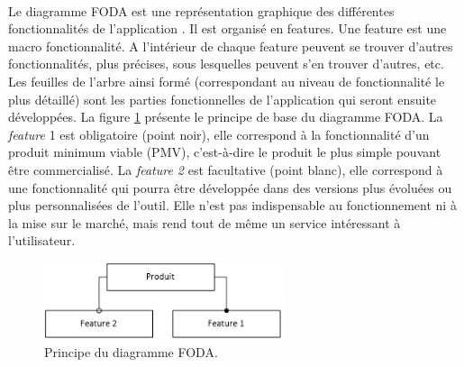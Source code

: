 			\paragraph{}%
			Le diagramme FODA est une représentation graphique des différentes
			fonctionnalités de l’application \citep{bontemps_semantics_2004}. Il est
			organisé en features.
			Une feature est une macro fonctionnalité. A l’intérieur de chaque feature
			peuvent se trouver d’autres fonctionnalités, plus précises, sous lesquelles
			peuvent s’en trouver d’autres, etc. Les feuilles de l’arbre ainsi formé
			(correspondant au niveau de fonctionnalité le plus détaillé) sont les parties
			fonctionnelles de l’application qui seront ensuite développées.\newline
			La figure \ref{foda_legende} présente le principe de base du diagramme FODA.
			La \textit{feature} 1 est obligatoire (point noir), elle correspond à la
			fonctionnalité d'un produit minimum viable (PMV), c'est-à-dire le produit le
			plus simple pouvant être commercialisé.
			La \textit{feature 2} est facultative (point blanc), elle correspond à une fonctionnalité qui pourra être
			développée dans des versions plus évoluées ou plus personnalisées de
			l’outil. Elle n’est pas indispensable au fonctionnement ni à la mise sur le
			marché, mais rend tout de même un service intéressant à l'utilisateur.
			\begin{figure}[H]%
				\centering
				\includegraphics[width=7cm]{../img/foda_legende.png}
				\caption{\label{foda_legende} Principe du diagramme FODA.}
			\end{figure}
			
